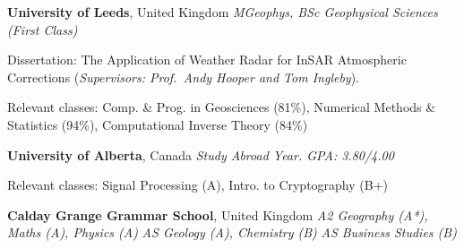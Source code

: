 %
\textbf{University of Leeds}, United Kingdom \newline
\emph{MGeophys, BSc Geophysical Sciences (First Class)} 
\begin{itemize*}
\item Dissertation: The Application of Weather Radar for InSAR Atmospheric
  Corrections (\emph{Supervisors: Prof.~Andy Hooper and Tom Ingleby}).
\item Relevant classes: Comp. \& Prog. in Geosciences (81\%), Numerical Methods
  \& Statistics (94\%), Computational Inverse Theory (84\%)
\end{itemize*}

\medskip
\textbf{University of Alberta}, Canada \newline
\emph{Study Abroad Year. GPA\@: 3.80/4.00} 
\begin{itemize*}
  \item Relevant classes: Signal Processing (A), Intro. to Cryptography (B+)
\end{itemize*}

\medskip
\textbf{Calday Grange Grammar School}, United Kingdom \newline
\emph{A2 Geography (A*), Maths (A), Physics (A)}  \newline
\emph{AS Geology (A), Chemistry (B)} \newline
\emph{AS Business Studies (B)} 

\bigskip

